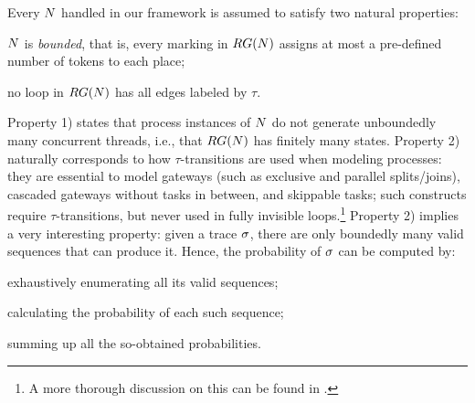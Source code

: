 Every \uswn $N$ handled in our framework is assumed to satisfy two natural properties:
\begin{compactenum}
\item $N$ is \emph{bounded}, that is, every marking in $RG(N)$ assigns at most a pre-defined number of tokens to each place;
\item no loop in $RG(N)$ has all edges labeled by $\tau$.
\end{compactenum}
Property 1) states that process instances of $N$ do not generate unboundedly many concurrent threads, i.e., that $RG(N)$ has finitely many states. Property 2) naturally corresponds to how $\tau$-transitions are used when modeling processes: they are essential to model  gateways (such as exclusive and parallel splits/joins), cascaded gateways without tasks in between, and skippable tasks; such constructs require  $\tau$-transitions, but never used in fully invisible loops.\footnote{A more thorough discussion on this can be found in \cite{Bergami21}.} 
%
Property 2) implies a very interesting property: given a trace ${\sigma}$, there are only boundedly many valid sequences that can produce it. Hence, the probability of ${\sigma}$ can be computed by:
\begin{inparaenum}[\it (i)]
\item exhaustively enumerating all its valid sequences;
\item calculating the probability of each such sequence;
\item summing up all the so-obtained probabilities.
\end{inparaenum}



